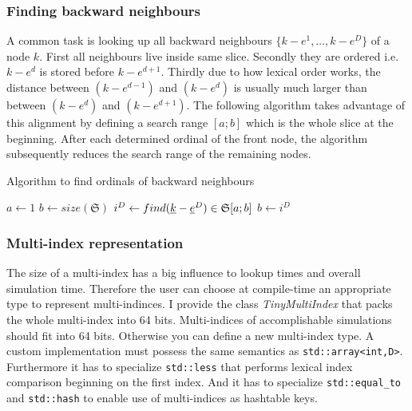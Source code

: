 \documentclass{article}
\def\code#1{\texttt{#1}}
\def\classname#1{\textit{#1}}
\begin{document}
\subsubsection{Finding backward neighbours}
A common task is looking up all backward neighbours \(\{k-e^1,\ldots,k-e^D\}\)
of a node \(k\). First all neighbours live inside same slice. Secondly they
are ordered i.e. \(k-e^d\) is stored before \(k-e^{d+1}\). Thirdly due to how lexical order
works, the distance between \((k-e^{d-1})\) and \((k-e^d)\) is usually much larger than
between \((k-e^d)\) and \((k-e^{d+1})\).
The following algorithm takes advantage of this alignment by defining a search range \([a;b]\)
which is the whole slice at the beginning.
After each determined ordinal of the front node, the algorithm subsequently reduces the search range
of the remaining nodes.

\begin{algorithm}[H]
  \caption{Algorithm to find ordinals of backward neighbours}
  \(a \leftarrow 1\)\;
  \(b \leftarrow size(\mathfrak{S})\)\;
  \(i^D \leftarrow find(\underline{k}-\underline{e}^D) \in \mathfrak{S}[a;b]\)\;
  \(b \leftarrow i^D\)\;
\end{algorithm}

\subsubsection{Multi-index representation}
The size of a multi-index has a big influence to lookup times and
overall simulation time. Therefore the user can choose at compile-time an appropriate
type to represent multi-indinces. I provide the class \classname{TinyMultiIndex}
that packs the whole multi-index into 64 bits.
Multi-indices of accomplishable simulations should fit into 64 bits.
Otherwise you can define a new multi-index type. A custom implementation
must possess the same semantics as \code{std::array<int,D>}.
Furthermore it has to specialize \code{std::less} that performs lexical index comparison
beginning on the first index.
And it has to specialize \code{std::equal\_to} and \code{std::hash} to
enable use of multi-indices as hashtable keys.
\end{document}
